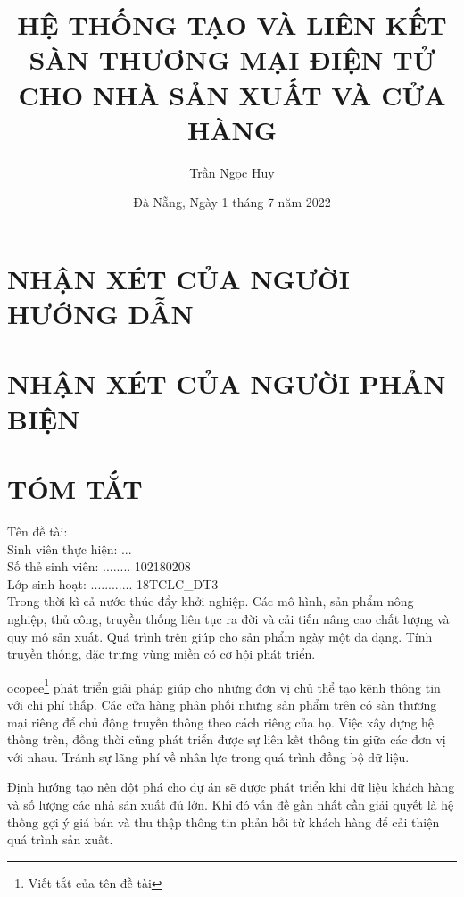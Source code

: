 \documentclass[11pt]{report}
\title{HỆ THỐNG TẠO VÀ LIÊN KẾT SÀN THƯƠNG MẠI ĐIỆN TỬ CHO NHÀ SẢN XUẤT VÀ CỬA HÀNG}
\author{Trần Ngọc Huy}
\date{Đà Nẵng, Ngày 1 tháng 7 năm 2022}
\newcommand{\msv}{102180208}
\newcommand{\myclass}{18TCLC\_DT3}
\begin{document}
\chapter*{NHẬN XÉT CỦA NGƯỜI HƯỚNG DẪN}
\pagebreak

\chapter*{NHẬN XÉT CỦA NGƯỜI PHẢN BIỆN}
\pagebreak



\chapter*{TÓM TẮT}

\raggedright
\makeatletter

Tên đề tài: \@title\\
Sinh viên thực hiện: ...\@author \dotfill\\
Số thẻ sinh viên: ........ \msv \dotfill\\
Lớp sinh hoạt: ............ \myclass \dotfill\\
\vspace{14px}
\justifying
\fontsize{13px}{17px}\selectfont
Trong thời kì cả nước thúc đẩy khởi nghiệp. Các mô hình, sản phẩm nông nghiệp, thủ công, truyền thống liên tục ra đời và cải tiến nâng cao chất lượng và quy mô sản xuất. Quá trình trên giúp cho sản phẩm ngày một đa dạng. Tính truyền thống, đặc trưng vùng miền có cơ hội phát triển.

\gls{ocopee}\footnote{Viết tắt của tên đề tài} phát triển giải pháp giúp cho những đơn vị chủ thể tạo kênh thông tin với chi phí thấp. Các cửa hàng phân phối những sản phẩm trên có sàn thương mại riêng để chủ động truyền thông theo cách riêng của họ. Việc xây dựng hệ thống trên, đồng thời cũng phát triển được sự liên kết thông tin giữa các đơn vị với nhau. Tránh sự lãng phí về nhân lực trong quá trình đồng bộ dữ liệu.

Định hướng tạo nên đột phá cho dự án sẽ được phát triển khi dữ liệu khách hàng và số lượng các nhà sản xuất đủ lớn. Khi đó vấn đề gần nhất cần giải quyết là hệ thống gợi ý giá bán và thu thập thông tin phản hồi từ khách hàng để cải thiện quá trình sản xuất.
\end{document}
